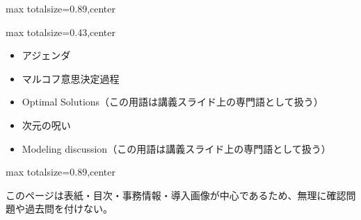 \begin{minipage}[t]{0.58\textwidth}
\begin{adjustbox}{max totalsize={\textwidth}{0.89\textheight},center}
\begin{minipage}{\textwidth}
\end{minipage}
\end{adjustbox}
\end{minipage}


\clearpage
{}
\begin{minipage}[t]{0.405\textwidth}
\begin{adjustbox}{max totalsize={\textwidth}{0.43\textheight},center}
\begin{minipage}{\textwidth}\scriptsize
{}\begin{itemize}
\item アジェンダ
\item マルコフ意思決定過程
\item Optimal Solutions（この用語は講義スライド上の専門語として扱う）
\item 次元の呪い
\item Modeling discussion（この用語は講義スライド上の専門語として扱う）
\end{itemize}
\end{minipage}
\end{adjustbox}
\end{minipage}\hfill
\begin{minipage}[t]{0.58\textwidth}
\begin{adjustbox}{max totalsize={\textwidth}{0.89\textheight},center}
\begin{minipage}{\textwidth}\scriptsize
{}このページは表紙・目次・事務情報・導入画像が中心であるため、無理に確認問題や過去問を付けない。
\end{minipage}
\end{adjustbox}
\end{minipage}


